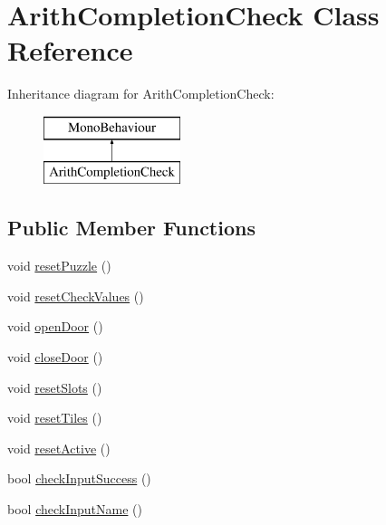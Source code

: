 \hypertarget{class_arith_completion_check}{}\section{Arith\+Completion\+Check Class Reference}
\label{class_arith_completion_check}
Inheritance diagram for Arith\+Completion\+Check\+:\begin{figure}[H]
\begin{center}
\leavevmode
\includegraphics[height=2.000000cm]{class_arith_completion_check}
\end{center}
\end{figure}
\subsection*{Public Member Functions}
\begin{DoxyCompactItemize}
\item 
void \hyperlink{class_arith_completion_check_ab9599e148944886425068a34ae9b236b}{reset\+Puzzle} ()
\item 
void \hyperlink{class_arith_completion_check_a2dd62a0cac8f383172e3a7ef51c3e3a9}{reset\+Check\+Values} ()
\item 
void \hyperlink{class_arith_completion_check_a1499d7cc0dfc5e25ff71ed683a7e1cab}{open\+Door} ()
\item 
void \hyperlink{class_arith_completion_check_a98f38be633381fc1cc645506c854e4c1}{close\+Door} ()
\item 
void \hyperlink{class_arith_completion_check_a43f1f829ee2eb6fd6191c1e76565859b}{reset\+Slots} ()
\item 
void \hyperlink{class_arith_completion_check_ab9934c3847957162e5c0bccbe6a47c8c}{reset\+Tiles} ()
\item 
void \hyperlink{class_arith_completion_check_ab96e74dffadaa774579de016d1e4a355}{reset\+Active} ()
\item 
bool \hyperlink{class_arith_completion_check_a29984173a121cf0859ed1a08f4c0e5bd}{check\+Input\+Success} ()
\item 
bool \hyperlink{class_arith_completion_check_ae813642087af9661c17a03f8545d6f34}{check\+Input\+Name} ()
\end{DoxyCompactItemize}

